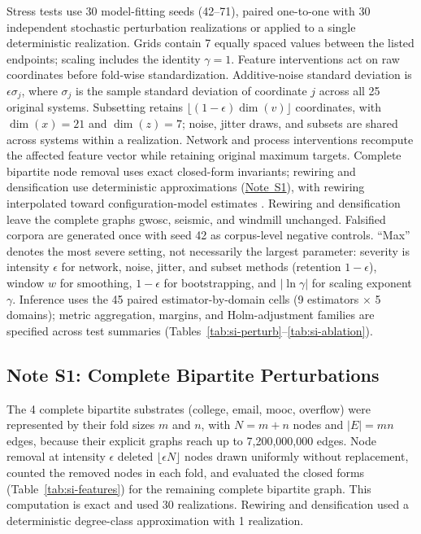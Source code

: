 \documentclass{article}
\begin{document}
\begin{table}[H]
\begin{minipage}{\linewidth}
Stress tests use 30 model-fitting seeds (42--71), paired one-to-one with 30 independent stochastic perturbation realizations or applied to a single deterministic realization. Grids contain 7 equally spaced values between the listed endpoints; scaling includes the identity $\gamma = 1$. Feature interventions act on raw coordinates before fold-wise standardization. Additive-noise standard deviation is $\epsilon\sigma_j$, where $\sigma_j$ is the sample standard deviation of coordinate $j$ across all 25 original systems. Subsetting retains $\lfloor (1 - \epsilon)\dim(v) \rfloor$ coordinates, with $\dim(x) = 21$ and $\dim(z) = 7$; noise, jitter draws, and subsets are shared across systems within a realization. Network and process interventions recompute the affected feature vector while retaining original maximum targets. Complete bipartite node removal uses exact closed-form invariants; rewiring and densification use deterministic approximations (\hyperref[sec:si-note-bipartite]{Note~S1}), with rewiring interpolated toward configuration-model estimates \citep{ref57}. Rewiring and densification leave the complete graphs gwosc, seismic, and windmill unchanged. Falsified corpora are generated once with seed 42 as corpus-level negative controls. ``Max'' denotes the most severe setting, not necessarily the largest parameter: severity is intensity $\epsilon$ for network, noise, jitter, and subset methods (retention $1 - \epsilon$), window $w$ for smoothing, $1 - \epsilon$ for bootstrapping, and $\lvert \ln \gamma \rvert$ for scaling exponent $\gamma$. Inference uses the 45 paired estimator-by-domain cells (9 estimators $\times$ 5 domains); metric aggregation, margins, and Holm-adjustment families are specified across test summaries (Tables~\ref{tab:si-perturb}--\ref{tab:si-ablation}).
\end{minipage}
\end{table}

\clearpage
\subsection*{Note S1: Complete Bipartite Perturbations}
\label{sec:si-note-bipartite}
The 4 complete bipartite substrates (college, email, mooc, overflow) were represented by their fold sizes $m$ and $n$, with $N = m + n$ nodes and $\lvert E \rvert = mn$ edges, because their explicit graphs reach up to 7,200,000,000 edges. Node removal at intensity $\epsilon$ deleted $\lfloor \epsilon N \rfloor$ nodes drawn uniformly without replacement, counted the removed nodes in each fold, and evaluated the closed forms (Table~\ref{tab:si-features}) for the remaining complete bipartite graph. This computation is exact and used 30 realizations. Rewiring and densification used a deterministic degree-class approximation with 1 realization.
\end{document}
